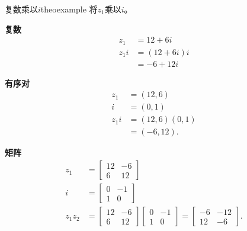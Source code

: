 \begin{myexample}{复数乘以\boldmath $i$}{theoexample}
将$z_{1}$乘以$i$。

\textbf{复数}
$$
  \begin{aligned}
    z_{1}   & =12+6 i     \\
    z_{1} i & =(12+6 i) i \\
            & =-6+12 i
  \end{aligned}
$$

\textbf{有序对}
$$
  \begin{aligned}
    z_{1}   & =(12,6)      \\
    i       & =(0,1)       \\
    z_{1} i & =(12,6)(0,1) \\
            & =(-6,12) .
  \end{aligned}
$$

\textbf{矩阵}
$$
  \begin{aligned}
    z_{1}       & =\left[\begin{array}{cc}
        12 & -6 \\
        6  & 12
      \end{array}\right]                                                                                    \\
    i           & =  {\left[\begin{array}{cc}
        0 & -1 \\
        1 & 0
      \end{array}\right] }                                                                               \\
    z_{1} z_{2} & =\left[\begin{array}{cc}
        12 & -6 \\
        6  & 12
      \end{array}\right]\left[\begin{array}{cc}
        0 & -1 \\
        1 & 0
      \end{array}\right]=\left[\begin{array}{cc}
        -6 & -12 \\
        12 & -6
      \end{array}\right] .
  \end{aligned}
$$
\end{myexample}

